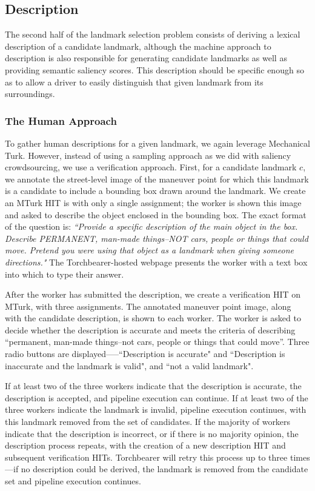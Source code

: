 \subsection{Description}
The second half of the landmark selection problem consists of deriving a lexical description of a candidate landmark, although the machine approach to description is also responsible for generating candidate landmarks as well as providing semantic saliency scores. This description should be specific enough so as to allow a driver to easily distinguish that given landmark from its surroundings.

\subsubsection{The Human Approach}\label{Sect:desc:human}
To gather human descriptions for a given landmark, we again leverage Mechanical Turk. However, instead of using a sampling approach as we did with saliency crowdsourcing, we use a verification approach.
First, for a candidate landmark $c$, we annotate the street-level image of the maneuver point for which this landmark is a candidate to include a bounding box drawn around the landmark. We create an MTurk HIT is with only a single assignment; the worker is shown this image and asked to describe the object enclosed in the bounding box. The exact format of the question is: \textit{``Provide a specific description of the main object in the box. Describe PERMANENT, man-made things--NOT cars, people or things that could move. Pretend you were using that object as a landmark when giving someone directions."} The Torchbearer-hosted webpage presents the worker with a text box into which to type their answer.

After the worker has submitted the description, we create a verification HIT on MTurk, with three assignments. The annotated maneuver point image, along with the candidate description, is shown to each worker. The worker is asked to decide whether the description is accurate and meets the criteria of describing “permanent, man-made things--not cars, people or things that could move”. Three radio buttons are displayed—--``Description is accurate" and ``Description is inaccurate and the landmark is valid", and ``not a valid landmark".

If at least two of the three workers indicate that the description is accurate, the description is accepted, and pipeline execution can continue. If at least two of the three workers indicate the landmark is invalid, pipeline execution continues, with this landmark removed from the set of candidates. If the majority of workers indicate that the description is incorrect, or if there is no majority opinion, the description process repeats, with the creation of a new description HIT and subsequent verification HITs. Torchbearer will retry this process up to three times---if no description could be derived, the landmark is removed from the candidate set and pipeline execution continues.

